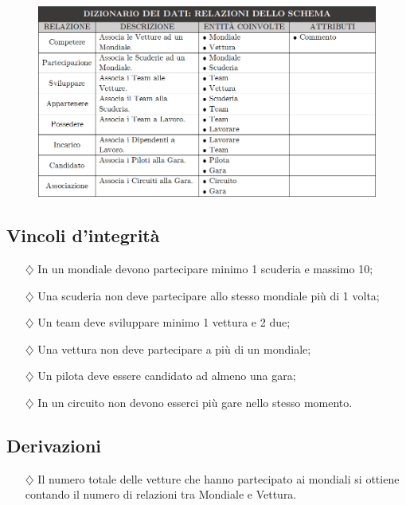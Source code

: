 \begin{figure}[H]
    \centering
    \includegraphics[scale = 0.74]{Images/Table/Dizionario dei dati - relazioni dello schema.png}
\end{figure}


\subsection{Vincoli d'integrità}
\begin{itemize}
    \item[$\diamondsuit$]  In un mondiale devono partecipare minimo 1 scuderia e massimo 10;
    \item[$\diamondsuit$] Una scuderia non deve partecipare allo stesso mondiale più di 1 volta;
    \item[$\diamondsuit$] Un team deve sviluppare minimo 1 vettura e 2 due;
    \item[$\diamondsuit$] Una vettura non deve partecipare a più di un mondiale;
    \item[$\diamondsuit$] Un pilota deve essere candidato ad almeno una gara;
    \item[$\diamondsuit$] In un circuito non devono esserci più gare nello stesso momento.
\end{itemize}

\subsection{Derivazioni}
\begin{itemize}
    \item[$\diamondsuit$] Il numero totale delle vetture che hanno partecipato ai mondiali si ottiene contando il numero di relazioni tra Mondiale e Vettura.
\end{itemize}

